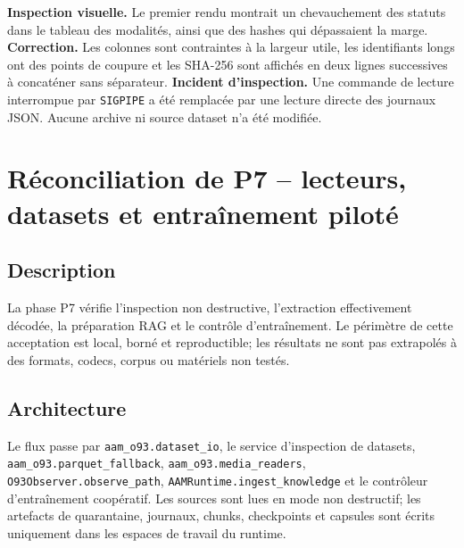 \documentclass[11pt,a4paper]{report}
\begin{document}
\textbf{Inspection visuelle.} Le premier rendu montrait un chevauchement des statuts dans le tableau des modalités, ainsi que des hashes qui dépassaient la marge.
\textbf{Correction.} Les colonnes sont contraintes à la largeur utile, les identifiants longs ont des points de coupure et les SHA-256 sont affichés en deux lignes successives à concaténer sans séparateur.
\textbf{Incident d'inspection.} Une commande de lecture interrompue par \texttt{SIGPIPE} a été remplacée par une lecture directe des journaux JSON. Aucune archive ni source dataset n'a été modifiée.

\section{Réconciliation de P7 -- lecteurs, datasets et entraînement piloté}
\subsection{Description}
La phase P7 vérifie l'inspection non destructive, l'extraction effectivement décodée, la préparation RAG et le contrôle d'entraînement. Le périmètre de cette acceptation est local, borné et reproductible; les résultats ne sont pas extrapolés à des formats, codecs, corpus ou matériels non testés.

\subsection{Architecture}
Le flux passe par \texttt{aam\_o93.dataset\_io}, le service d'inspection de datasets, \texttt{aam\_o93.parquet\_fallback}, \texttt{aam\_o93.media\_readers}, \texttt{O93Observer.observe\_path}, \texttt{AAMRuntime.ingest\_knowledge} et le contrôleur d'entraînement coopératif. Les sources sont lues en mode non destructif; les artefacts de quarantaine, journaux, chunks, checkpoints et capsules sont écrits uniquement dans les espaces de travail du runtime.
\end{document}
